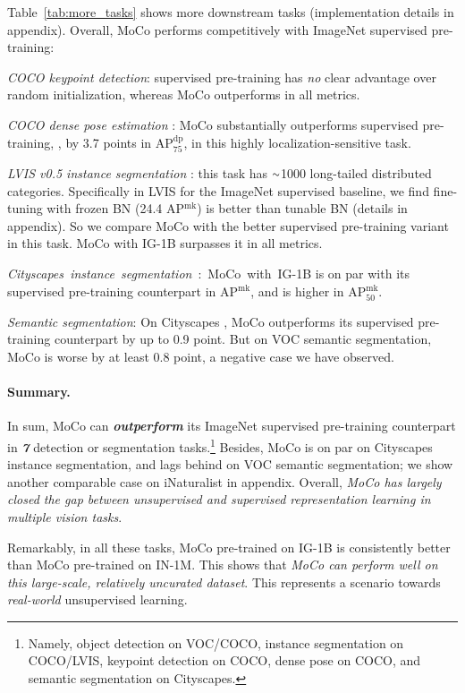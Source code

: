 \documentclass[10pt,twocolumn,letterpaper]{article}
\newcommand{\app}{\raise.17ex\hbox{$\scriptstyle\sim$}}
\newcommand{\apmask}[1]{AP$^\text{mk}_\text{#1}$}
\newcommand{\apdp}[1]{AP$^\text{dp}_\text{#1}$}
\newcommand{\appdx}{appendix}
\begin{document}
Table~\ref{tab:more_tasks} shows more downstream tasks (implementation details in \appdx). Overall, MoCo performs competitively with ImageNet supervised pre-training:

\emph{COCO keypoint detection}: supervised pre-training has \emph{no} clear advantage over random initialization, whereas MoCo outperforms in all metrics. 

\emph{COCO dense pose estimation} \cite{AlpGueler2018}: MoCo substantially outperforms supervised pre-training, \eg, by 3.7 points in \apdp{75}, in this highly localization-sensitive task.

\emph{LVIS v0.5 instance segmentation} \cite{Gupta2019}: this task has $\app$1000 long-tailed distributed categories.
Specifically in LVIS for the ImageNet supervised baseline, we find fine-tuning with frozen BN (24.4 \apmask{}) is better than tunable BN (details in \appdx). So we compare MoCo with the better supervised pre-training variant in this task. MoCo with IG-1B surpasses it in all metrics.

\mbox{\emph{Cityscapes instance segmentation} \cite{Cordts2016}: MoCo with IG-1B} is on par with its supervised pre-training counterpart in \apmask{}, and is higher in \apmask{50}.

\emph{Semantic segmentation}: On Cityscapes \cite{Cordts2016}, MoCo outperforms its supervised pre-training counterpart by up to 0.9 point. But on VOC semantic segmentation, MoCo is worse by at least 0.8 point, a negative case we have observed.

\paragraph{Summary.}
In sum, MoCo can \textbf{\emph{outperform}} its ImageNet supervised pre-training counterpart in \textbf{\emph{7}} detection or segmentation tasks.\footnote{Namely, object detection on VOC/COCO, instance segmentation on COCO/LVIS, keypoint detection on COCO, dense pose on COCO, and semantic segmentation on Cityscapes.}
Besides, MoCo is on par on Cityscapes instance segmentation, and lags behind on VOC semantic segmentation; we show another comparable case on iNaturalist \cite{VanHorn2018} in \appdx. Overall, \emph{MoCo has largely closed the gap between unsupervised and supervised representation learning in multiple vision tasks}.

Remarkably, in all these tasks, MoCo pre-trained on \mbox{IG-1B} is consistently better than MoCo pre-trained on \mbox{IN-1M}.
This shows that \emph{MoCo can perform well on this large-scale, relatively uncurated dataset}. This represents a scenario towards \emph{real-world} unsupervised learning.
\end{document}
